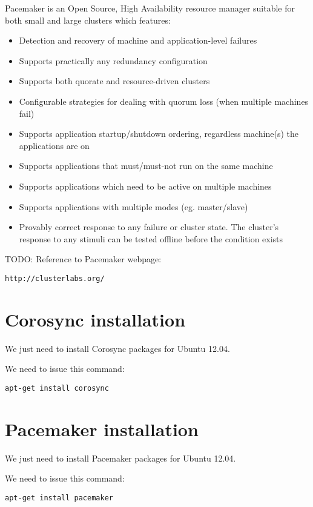 Pacemaker is an Open Source, High Availability resource manager suitable for both small and large clusters which features:
\begin{itemize}
  \item Detection and recovery of machine and application-level failures
  \item Supports practically any redundancy configuration
  \item Supports both quorate and resource-driven clusters
  \item Configurable strategies for dealing with quorum loss (when multiple machines fail)
  \item Supports application startup/shutdown ordering, regardless machine(s) the applications are on
  \item Supports applications that must/must-not run on the same machine
  \item Supports applications which need to be active on multiple machines
  \item Supports applications with multiple modes (eg. master/slave)
  \item Provably correct response to any failure or cluster state. The cluster's response to any stimuli can be tested offline before the condition exists
\end{itemize}

TODO: Reference to Pacemaker webpage:
\begin{verbatim}
http://clusterlabs.org/
\end{verbatim}


\section {Corosync installation}
We just need to install Corosync packages for Ubuntu 12.04.

We need to issue this command:
\begin{verbatim}
apt-get install corosync
\end{verbatim}


\section {Pacemaker installation}
We just need to install Pacemaker packages for Ubuntu 12.04.

We need to issue this command:
\begin{verbatim}
apt-get install pacemaker
\end{verbatim}
